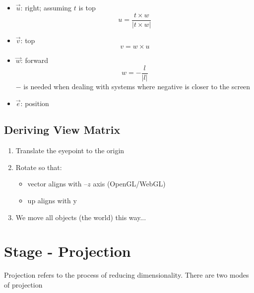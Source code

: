   \begin{itemize}
    \item $ \vec{u} $: right; assuming $ t $ is top
    \begin{equation}
      u = \frac{t \times w}{\left| t \times w \right|}
    \end{equation}

    \item $ \vec{v} $: top
    \begin{equation}
      v = w \times u
    \end{equation}

    \item $ \vec{w} $: forward
    \begin{equation}
      w = - \frac{l}{\left| l \right|}
    \end{equation}
    $ - $ is needed when dealing with systems where negative is closer to the
    screen

    \item $ \vec{e} $: position
  \end{itemize}

  \subsection{Deriving View Matrix}

    \begin{enumerate}
      \item Translate the eyepoint to the origin
      \item Rotate so that:
      \begin{itemize}
        \item {} vector aligns with $ –z $ axis (OpenGL/WebGL)
        \item up aligns with y
      \end{itemize}

      \item We move all objects (the world) this way...
    \end{enumerate}

\section{Stage - Projection}

  Projection refers to the process of reducing dimensionality. There are two
  modes of projection

